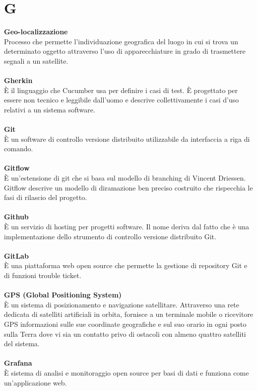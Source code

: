 \section{G}
\textbf{Geo-localizzazione}\\
Processo che permette l'individuazione geografica del luogo in cui si trova un determinato oggetto attraverso l'uso di apparecchiature in grado di trasmettere segnali a un satellite. \\ \\
\textbf{Gherkin}\\
È il linguaggio che Cucumber usa per definire i casi di test. È progettato per essere non tecnico e leggibile dall'uomo e descrive collettivamente i casi d'uso relativi a un sistema software. \\ \\
\textbf{Git}\\
È un software di controllo versione distribuito utilizzabile da interfaccia a riga di comando. \\ \\
\textbf{Gitflow}\\
È un’estensione di git che si basa sul modello di branching di Vincent Driessen. Gitflow descrive un modello di diramazione ben preciso costruito che rispecchia le fasi di rilascio del progetto.\\ \\
\textbf{Github}\\
È un servizio di hosting per progetti software. Il nome deriva dal fatto che è una implementazione dello strumento di controllo versione distribuito Git. \\ \\
\textbf{GitLab}\\
È una piattaforma web open source che permette la gestione di repository Git e di funzioni trouble ticket. \\ \\
\textbf{GPS (Global Positioning System)}\\
È un sistema di posizionamento e navigazione satellitare. Attraverso una rete dedicata di satelliti artificiali in orbita, fornisce a un terminale mobile o ricevitore GPS informazioni sulle sue coordinate geografiche e sul suo orario in ogni posto sulla Terra dove vi sia un contatto privo di ostacoli con almeno quattro satelliti del sistema. \\ \\
\textbf{Grafana}\\
È sistema di analisi e monitoraggio open source per basi di dati e funziona come un'applicazione web. \\ \\
\clearpage